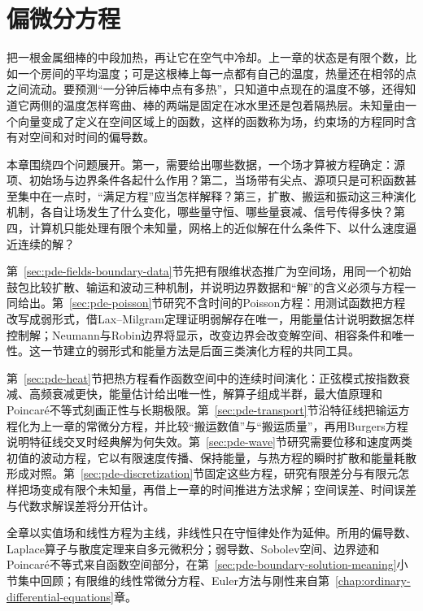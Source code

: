 \chapter{偏微分方程}
\label{chap:partial-differential-equations}

把一根金属细棒的中段加热，再让它在空气中冷却。上一章的状态是有限个数，比如一个房间的平均温度；可是这根棒上每一点都有自己的温度，热量还在相邻的点之间流动。要预测“一分钟后棒中点有多热”，只知道中点现在的温度不够，还得知道它两侧的温度怎样弯曲、棒的两端是固定在冰水里还是包着隔热层。未知量由一个向量变成了定义在空间区域上的函数，这样的函数称为场，约束场的方程同时含有对空间和对时间的偏导数。

本章围绕四个问题展开。第一，需要给出哪些数据，一个场才算被方程确定：源项、初始场与边界条件各起什么作用？第二，当场带有尖点、源项只是可积函数甚至集中在一点时，“满足方程”应当怎样解释？第三，扩散、搬运和振动这三种演化机制，各自让场发生了什么变化，哪些量守恒、哪些量衰减、信号传得多快？第四，计算机只能处理有限个未知量，网格上的近似解在什么条件下、以什么速度逼近连续的解？

第~\ref{sec:pde-fields-boundary-data}节先把有限维状态推广为空间场，用同一个初始鼓包比较扩散、输运和波动三种机制，并说明边界数据和“解”的含义必须与方程一同给出。第~\ref{sec:pde-poisson}节研究不含时间的Poisson方程：用测试函数把方程改写成弱形式，借Lax--Milgram定理证明弱解存在唯一，用能量估计说明数据怎样控制解；Neumann与Robin边界将显示，改变边界会改变解空间、相容条件和唯一性。这一节建立的弱形式和能量方法是后面三类演化方程的共同工具。

第~\ref{sec:pde-heat}节把热方程看作函数空间中的连续时间演化：正弦模式按指数衰减、高频衰减更快，能量估计给出唯一性，解算子组成半群，最大值原理和Poincaré不等式刻画正性与长期极限。第~\ref{sec:pde-transport}节沿特征线把输运方程化为上一章的常微分方程，并比较“搬运数值”与“搬运质量”，再用Burgers方程说明特征线交叉时经典解为何失效。第~\ref{sec:pde-wave}节研究需要位移和速度两类初值的波动方程，它以有限速度传播、保持能量，与热方程的瞬时扩散和能量耗散形成对照。第~\ref{sec:pde-discretization}节固定这些方程，研究有限差分与有限元怎样把场变成有限个未知量，再借上一章的时间推进方法求解；空间误差、时间误差与代数求解误差将分开估计。

全章以实值场和线性方程为主线，非线性只在守恒律处作为延伸。所用的偏导数、Laplace算子与散度定理来自多元微积分；弱导数、Sobolev空间、边界迹和Poincaré不等式来自函数空间部分，在第~\ref{sec:pde-boundary-solution-meaning}小节集中回顾；有限维的线性常微分方程、Euler方法与刚性来自第~\ref{chap:ordinary-differential-equations}章。


